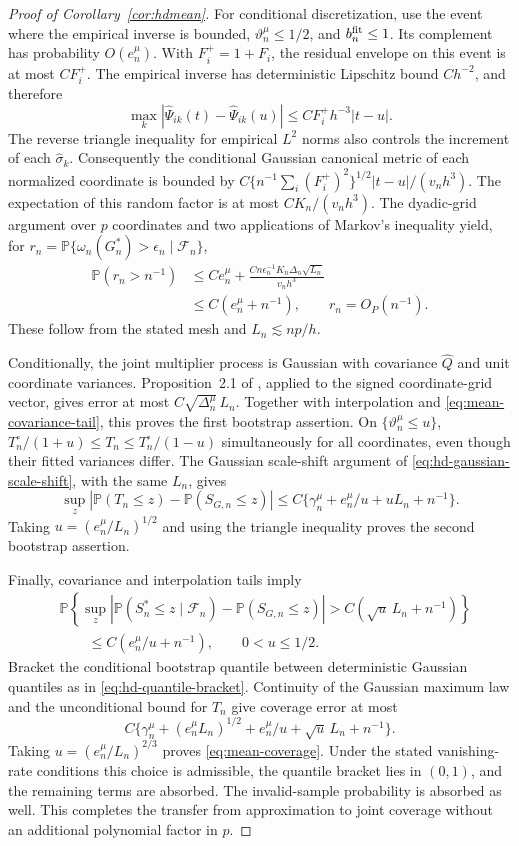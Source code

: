 \documentclass[12pt]{article}
\newcommand{\prob}{\mathbb{P}}
\numberwithin{equation}{section}
\begin{document}
\begin{proof}[Proof of Corollary~\ref{cor:hdmean}]
For conditional discretization, use the event where the empirical
inverse is bounded, $\vartheta_n^\mu\le1/2$, and $b_n^{\rm fit}\le1$.
Its complement has probability $O(e_n^\mu)$. With
$F_i^+=1+F_i$, the residual envelope on this event is at most $CF_i^+$.
The empirical inverse has deterministic
Lipschitz bound $Ch^{-2}$, and therefore
\[
\max_k|\widehat\Psi_{ik}(t)-\widehat\Psi_{ik}(u)|
\le CF_i^+ h^{-3}|t-u|.
\]
The reverse triangle inequality for empirical $L^2$ norms also
controls the increment of each $\widehat\sigma_k$.
Consequently the conditional Gaussian canonical metric of each
normalized coordinate is bounded by
$C\{n^{-1}\sum_i(F_i^+)^2\}^{1/2}|t-u|/(v_nh^3)$.
The expectation of this random factor is at most $CK_n/(v_nh^3)$.
The dyadic-grid argument over $p$ coordinates and two applications
of Markov's inequality yield, for
$r_n=\prob\{\omega_n(G_n^*)>\epsilon_n\mid\mathcal F_n\}$,
\[
\begin{aligned}
\prob(r_n>n^{-1})&\le Ce_n^\mu+
\frac{Cn\epsilon_n^{-1}K_n\Delta_n\sqrt{L_n}}{v_nh^3}
\\
&\le C(e_n^\mu+n^{-1}),\qquad r_n=O_P(n^{-1}).
\end{aligned}
\]
These follow from the stated mesh and $L_n\lesssim np/h$.

Conditionally, the joint multiplier process is Gaussian with covariance
$\widehat Q$ and unit coordinate variances. Proposition~2.1 of
\citet{chernozhukov_et_al_2022}, applied to the signed coordinate-grid
vector, gives error at most
$C\sqrt{\Delta_n^\mu}\,L_n$. Together with interpolation and
\eqref{eq:mean-covariance-tail}, this proves the first bootstrap assertion.
On $\{\vartheta_n^\mu\le u\}$,
$T_n^\circ/(1+u)\le T_n\le T_n^\circ/(1-u)$ simultaneously for all
coordinates, even though their fitted variances differ.
The Gaussian scale-shift argument of
\eqref{eq:hd-gaussian-scale-shift}, with the same $L_n$, gives
\[
\sup_z|\prob(T_n\le z)-\prob(S_{G,n}\le z)|
\le C\{\gamma_n^\mu+e_n^\mu/u+uL_n+n^{-1}\}.
\]
Taking $u=(e_n^\mu/L_n)^{1/2}$ and using the triangle inequality
proves the second bootstrap assertion.

Finally, covariance and interpolation tails imply
\[
\begin{aligned}
&\prob\left\{\sup_z|\prob(S_n^*\le z\mid\mathcal F_n)
-\prob(S_{G,n}\le z)|>C(\sqrt u\,L_n+n^{-1})\right\}\\
&\qquad\le C(e_n^\mu/u+n^{-1}),\qquad 0<u\le1/2 .
\end{aligned}
\]
Bracket the conditional bootstrap quantile between deterministic
Gaussian quantiles as in \eqref{eq:hd-quantile-bracket}. Continuity of
the Gaussian maximum law and the unconditional bound for $T_n$ give
coverage error at most
\[
C\{\gamma_n^\mu+(e_n^\mu L_n)^{1/2}
+e_n^\mu/u+\sqrt u\,L_n+n^{-1}\}.
\]
Taking $u=(e_n^\mu/L_n)^{2/3}$ proves \eqref{eq:mean-coverage}.
Under the stated vanishing-rate conditions this choice is admissible,
the quantile bracket lies in $(0,1)$, and the remaining terms are
absorbed. The invalid-sample probability is absorbed as well.
This completes the transfer from approximation to joint coverage
without an additional polynomial factor in $p$.
\end{proof}
\end{document}
